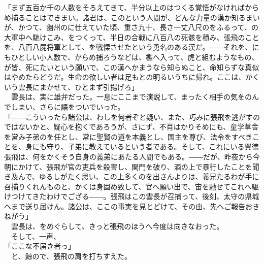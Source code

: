\documentclass[
  paper=a5,
  fontsize=10pt,
  jafontsize=9.5pt,
  tate,                  %
  open_bracket_pos=nibu, %
]{jlreq}
\begin{document}
「まず五百か千の人数をそろえてきて、半分以上のはつくる覚悟がなければからめ捕ることはできまい。諸君は、このという人間が、どんな力量の漢か知るまいが、かつて、幽州のに仕えていた頃、重さ九十、長さ一丈八尺のをふるって、の大軍中へ馳けこみ、をつくって、半日の合戦に八百八の死骸を積み、張飛のことを、八百八屍将軍として、を戦慄させたという勇名のある漢だ。――それを、にもひとしい小人数で、からめ捕ろうなどは、檻へ入って、虎と組むようなもの、が皆、死にたいという願いで、この漢へかまうなら知らぬこと、命知らずな真似はやめたらどうだ。生命の欲しい者は足もとの明るいうちに帰れ。ここは、かくいう雲長にまかせて、ひとまず引揚げろ」\\


　雲長は、実に雄弁だった。一息にここまで演説して、まったく相手の気をのんでしまい、さらに語をついでいった。\\


「――こういったら諸公は、わしを何者ぞと疑い、また、巧みに張飛を逃がすのではないかと、疑心を抱くであろうが、さにず、不肖はかりそめにも、童学草舎を営み子弟のを任とし、常に聖賢の道を本義とし、国主を尊び、法令をすべきことを、身にも守り、子弟に教えているという者である。そして、これにいる翼徳張飛は、何をかくそう自身の義弟にあたる人間でもある。――だが、昨夜から今朝にかけて、張飛が官の吏兵を殺害し、関門を破り、酒の上で暴行したことを聞き及んで、ゆるしがたく思い、この上多くのを出さんよりは、義兄たるわが手に召捕りくれんものと、かくは身固め致して、官へ願い出で、宙を馳せてこれへ駆けつけてきたわけでござる――。張飛はこの雲長が召捕って、後刻、太守の県城へまで送り届けん。諸公は、ここの事実を見とどけて、その由、先へご報告おきねがう」\\


　雲長は、をめぐらして、きっと張飛のほうへ今度は向きなおった。\\


　そして、一声、\\


「ここな不届き者っ」\\


　と、鯨ので、張飛の肩を打ちすえた。\\
\end{document}
